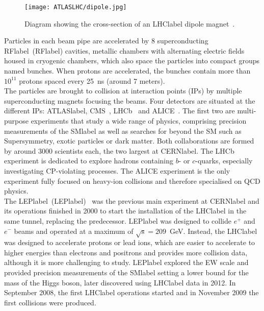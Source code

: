 \begin{figure}[htbp]
    \RawFloats
    \begin{center}
    \texttt{[image: ATLASLHC/dipole.jpg]}
    \caption{
        Diagram showing the cross-section of an \acrshort{LHClabel} dipole magnet~\cite{LHCdipole}. 
    }
    \label{figLHC:dipole}
    \end{center}
\end{figure}

Particles in each beam pipe are accelerated by 8 superconducting \acrlong{RFlabel}~(\acrshort{RFlabel}) cavities, metallic chambers with alternating electric fields housed in cryogenic chambers, which also space the particles into compact groups named bunches. When protons are accelerated, the bunches contain more than $10^{11}$ protons spaced every 25~ns (around 7 meters).\\

The particles are brought to collision at interaction points (IPs) by multiple superconducting magnets focusing the beams. Four detectors are situated at the different IPs: \acrshort{ATLASlabel}, CMS~\cite{CMSmachine}, LHCb~\cite{LHCbmachine} and ALICE~\cite{ALICEmachine}. The first two are multi-purpose experiments that study a wide range of physics, comprising precision measurements of the \acrshort{SMlabel} as well as searches for beyond the SM such as Supersymmetry, exotic particles or dark matter. Both collaborations are formed by around 3000 scientists each, the two largest at \acrshort{CERNlabel}. The LHCb experiment is dedicated to explore hadrons containing $b$- or $c$-quarks, especially investigating CP-violating processes. The ALICE experiment is the only experiment fully focused on heavy-ion collisions and therefore specialised on QCD physics.\\

The \acrlong{LEPlabel}~(\acrshort{LEPlabel})~\cite{LEPmachine} was the previous main experiment at \acrshort{CERNlabel} and its operations finished in 2000 to start the installation of the \acrshort{LHClabel} in the same tunnel, replacing the predecessor. \acrshort{LEPlabel} was designed to collide $e^+$ and $e^-$ beams and operated at a maximum of $\sqrt{\text{s}}=209$~GeV. Instead, the \acrshort{LHClabel} was designed to accelerate protons or lead ions, which are easier to accelerate to higher energies than electrons and positrons and provides more collision data, although it is more challenging to study. \acrshort{LEPlabel} explored the \acrshort{EW} scale and provided precision measurements of the \acrshort{SMlabel} setting a lower bound for the mass of the Higgs boson, later discovered using \acrshort{LHClabel} data in 2012. In September 2008, the first \acrshort{LHClabel} operations started and in November 2009 the first collisions were produced. 

